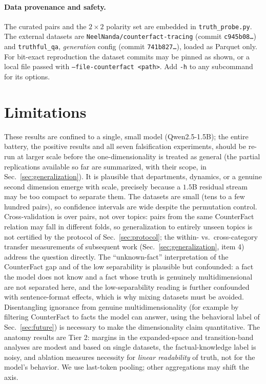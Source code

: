 \documentclass[11pt]{article}
\begin{document}
\paragraph{Data provenance and safety.} The curated pairs and the
$2{\times}2$ polarity set are embedded in \texttt{truth\_probe.py}. The
external datasets are \texttt{NeelNanda/counterfact-tracing} (commit
\texttt{c945b08\ldots}) and \texttt{truthful\_qa}, \emph{generation} config
(commit \texttt{741b827\ldots}), loaded as Parquet only. For bit-exact
reproduction the dataset commits may be pinned as shown, or a local file
passed with \texttt{--file-counterfact <path>}. Add \texttt{-h} to any
subcommand for its options.

\section{Limitations}
\label{sec:limits}

These results are confined to a single, small model (Qwen2.5-1.5B); the
entire battery, the positive results and all seven falsification experiments,
should be re-run at larger scale before the one-dimensionality is treated as
general (the partial replications available so far are summarized, with their
scope, in Sec.~\ref{sec:generalization}). It is plausible that departments,
dynamics, or a genuine second dimension emerge with scale, precisely because
a $1.5$B residual stream may be too compact to separate them. The datasets
are small (tens to a few hundred pairs), so confidence intervals are wide
despite the permutation control. Cross-validation is over pairs, not over
topics: pairs from the same CounterFact relation may fall in different folds,
so generalization to entirely unseen topics is not certified by the protocol
of Sec.~\ref{sec:protocol}; the within- vs.\ cross-category transfer
measurements of subsequent work (Sec.~\ref{sec:generalization}, item 4)
address the question directly. The ``unknown-fact'' interpretation of the
CounterFact gap and of the low separability is plausible but confounded: a
fact the model does not know and a fact whose truth is genuinely
multidimensional are not separated here, and the low-separability reading is
further confounded with sentence-format effects, which is why mixing datasets
must be avoided. Disentangling ignorance from genuine multidimensionality
(for example by filtering CounterFact to facts the model can answer, using
the behavioral label of Sec.~\ref{sec:future}) is necessary to make the
dimensionality claim quantitative. The anatomy results are Tier 2: margins in
the expanded-space and transition-band analyses are modest and based on
single datasets, the factual-knowledge label is noisy, and ablation measures
necessity for \emph{linear readability} of truth, not for the model's
behavior. We use last-token pooling; other aggregations may shift the axis.
\end{document}
